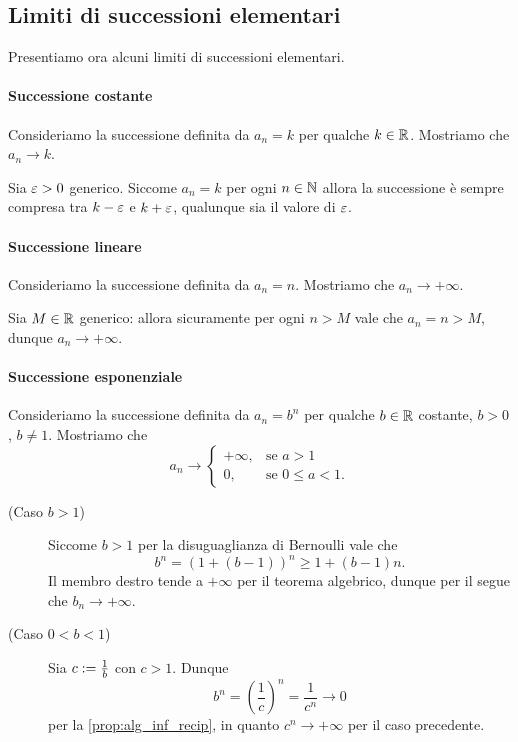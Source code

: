 \subsection{Limiti di successioni elementari}

Presentiamo ora alcuni limiti di successioni elementari.

\paragraph{Successione costante} Consideriamo la successione definita da $a_n = k$ per qualche $k \in \mathbb{R}$. Mostriamo che $a_n \to k$.

Sia $\varepsilon > 0$ generico. Siccome $a_n = k$ per ogni $n \in \mathbb{N}$ allora la successione è sempre compresa tra $k - \varepsilon$ e $k + \varepsilon$, qualunque sia il valore di $\varepsilon$.

\paragraph{Successione lineare} Consideriamo la successione definita da $a_n = n$. Mostriamo che $a_n \to +\infty$.

Sia $M \in \mathbb{R}$ generico: allora sicuramente per ogni $n > M$ vale che $a_n = n > M$, dunque $a_n \to +\infty$.

\paragraph{Successione esponenziale} Consideriamo la successione definita da $a_n = b^n$ per qualche $b \in \mathbb{R}$ costante, $b > 0$, $b \neq 1$. Mostriamo che \[
    a_n \to \begin{cases}
        +\infty, &\text{se } a > 1\\
        0, &\text{se } 0 \leq a < 1.
    \end{cases}    
\]

\begin{description}
    \item[(Caso $b > 1$)] Siccome $b > 1$ per la disuguaglianza di Bernoulli vale che \[
        b^n = (1 + (b-1))^n \geq 1 + (b-1)n.    
    \] Il membro destro tende a $+\infty$ per il teorema algebrico, dunque per il  segue che $b_n \to +\infty$.
    \item[(Caso $0 < b < 1$)] Sia $c := \frac{1}{b}$ con $c > 1$. Dunque \[
        b^n = \left( \frac{1}{c} \right)^n = \frac{1}{c^n} \to 0    
    \] per la \autoref{prop:alg_inf_recip}, in quanto $c^n \to +\infty$ per il caso precedente.
\end{description}

